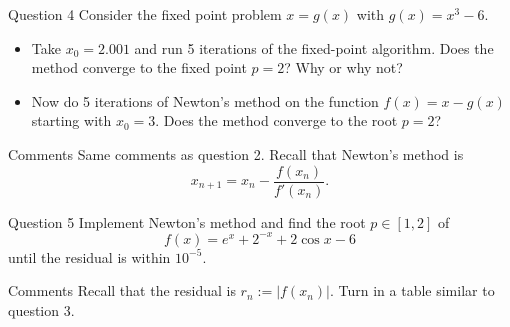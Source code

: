 \documentclass{beamer}
\begin{document}
\begin{frame}{Question 4}
  Consider the fixed point problem $x = g(x)$ with $g(x) = x^3 - 6$.
  \vfill
  \begin{itemize}
    \item[(1)] Take $x_0 = 2.001$ and run 5 iterations of the fixed-point algorithm. Does the method converge to the fixed point $p = 2$? Why or why not?
      \vfill
    \item[(2)] Now do 5 iterations of Newton's method on the function $f(x) = x - g(x)$ starting with $x_0 = 3$. Does the method converge to the root $p = 2$?
  \end{itemize}
  \vfill
  \begin{block}{Comments}
    Same comments as question 2. Recall that Newton's method is
    \begin{equation*}
      x_{n+1} = x_n - \frac{f(x_n)}{f'(x_n)}.
    \end{equation*}
  \end{block}
\end{frame}

\begin{frame}{Question 5}
  Implement Newton's method and find the root $p \in [1,2]$ of
  \begin{equation*}
    f(x) = e^x + 2^{-x} + 2\cos x - 6
  \end{equation*}
  until the residual is within $10^{-5}$.
  \vfill
  \begin{block}{Comments}
    Recall that the residual is $r_n := |f(x_n)|$. Turn in a table similar to question 3.
  \end{block}
\end{frame}
\end{document}

